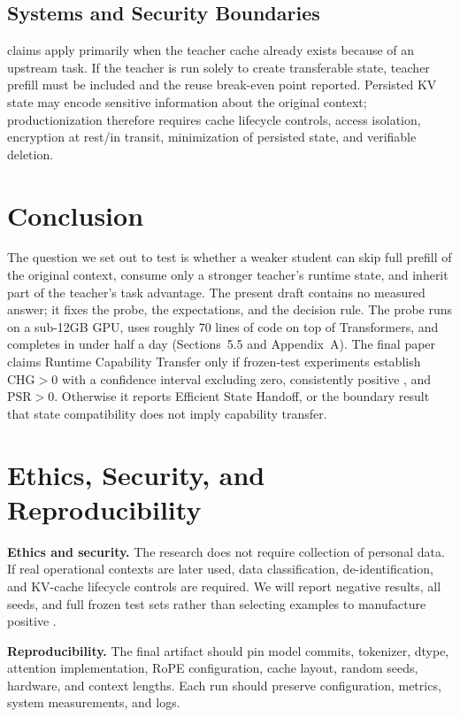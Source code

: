\documentclass[10pt]{article}
\newcommand{\chg}{\text{CHG}}
\newcommand{\tgrr}{\text{TGRR}}
\newcommand{\psr}{\text{PSR}}
\begin{document}
\subsection{Systems and Security Boundaries}
\psr{} claims apply primarily when the teacher cache already exists because of an upstream task.
If the teacher is run solely to create transferable state, teacher prefill must be included and
the reuse break-even point reported. Persisted KV state may encode sensitive information about the
original context; productionization therefore requires cache lifecycle controls, access isolation,
encryption at rest/in transit, minimization of persisted state, and verifiable deletion.

\section{Conclusion}
The question we set out to test is whether a weaker student can skip full prefill of the original
context, consume only a stronger teacher's runtime state, and inherit part of the teacher's task
advantage. The present draft contains no measured answer; it fixes the probe, the expectations,
and the decision rule. The probe runs on a sub-12GB GPU, uses roughly 70 lines of code on top of
Transformers, and completes in under half a day (Sections~5.5 and Appendix~A). The final paper
claims Runtime Capability Transfer only if frozen-test experiments establish $\chg>0$ with a
confidence interval excluding zero, consistently positive \tgrr, and $\psr>0$. Otherwise it
reports Efficient State Handoff, or the boundary result that state compatibility does not imply
capability transfer.

\section*{Ethics, Security, and Reproducibility}
\textbf{Ethics and security.} The research does not require collection of personal data. If real
operational contexts are later used, data classification, de-identification, and KV-cache
lifecycle controls are required. We will report negative results, all seeds, and full frozen test
sets rather than selecting examples to manufacture positive \chg.

\textbf{Reproducibility.} The final artifact should pin model commits, tokenizer, dtype, attention
implementation, RoPE configuration, cache layout, random seeds, hardware, and context lengths.
Each run should preserve configuration, metrics, system measurements, and logs.
\end{document}
